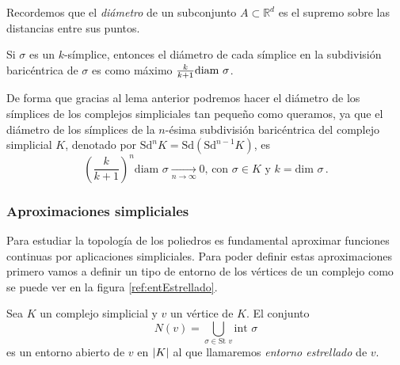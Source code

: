 Recordemos que el \emph{diámetro} de un subconjunto $A \subset \mathbb{R}^d$ es el supremo sobre las distancias entre sus puntos. 

\begin{lemma}
Si $\sigma$ es un $k$-símplice, entonces el diámetro de cada símplice en la subdivisión baricéntrica de $\sigma$ es como máximo $\frac{k}{k+1}\text{\rm diam }\sigma$.
\end{lemma}

De forma que gracias al lema anterior podremos hacer el diámetro de los símplices de los complejos simpliciales tan pequeño como queramos, ya que el diámetro de los símplices de la $n$-ésima subdivisión baricéntrica del complejo simplicial $K$, denotado por $\text{Sd}^nK = \text{Sd}(\text{Sd}^{n - 1}K)$, es 
\[
\left ( \frac{k}{k+1} \right )^n \text{diam } \sigma  \underset{n \to \infty}{\longrightarrow} 0 \text{, con } \sigma \in K \text{ y } k = \text{dim } \sigma\,.
\]

\subsubsection*{Aproximaciones simpliciales}
Para estudiar la topología de los poliedros es fundamental aproximar funciones continuas por aplicaciones simpliciales. Para poder definir estas aproximaciones primero vamos a definir un tipo de entorno de los vértices de un complejo como se puede ver en la figura \ref{ref:entEstrellado}.

\begin{definition}
Sea $K$ un complejo simplicial y $v$ un vértice de $K$. El conjunto
\[
N(v) = \bigcup_{\sigma \in \text{St } v} \text{int }\sigma
\]
es un entorno abierto de $v$ en $\lvert K\rvert$ al que llamaremos \emph{entorno estrellado} de $v$.
\end{definition}

